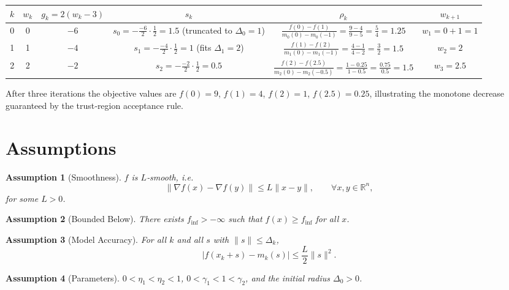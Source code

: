 \documentclass[11pt]{article}
\newtheorem{assumption}{Assumption}
\newcommand{\R}{\mathbb{R}}
\begin{document}
\begin{center}
\begin{tabular}{c|c|c|c|c|c}
$k$ & $w_{k}$ & $g_{k}=2(w_{k}-3)$ & $s_{k}$ & $\rho_{k}$ & $w_{k+1}$\\ \hline
0 & 0 & $-6$ & $s_{0}= -\frac{-6}{2}\cdot\frac12 =1.5$ (truncated to $\Delta_{0}=1$) & 
$\displaystyle\frac{f(0)-f(1)}{m_{0}(0)-m_{0}(-1)}=\frac{9-4}{9-5}= \frac{5}{4}=1.25$ & $w_{1}=0+1=1$\\ \hline
1 & 1 & $-4$ & $s_{1}= -\frac{-4}{2}\cdot\frac12 =1$ (fits $\Delta_{1}=2$) &
$\displaystyle\frac{f(1)-f(2)}{m_{1}(0)-m_{1}(-1)}=\frac{4-1}{4-2}= \frac{3}{2}=1.5$ & $w_{2}=2$\\ \hline
2 & 2 & $-2$ & $s_{2}= -\frac{-2}{2}\cdot\frac12 =0.5$ &
$\displaystyle\frac{f(2)-f(2.5)}{m_{2}(0)-m_{2}(-0.5)}=\frac{1-0.25}{1-0.5}= \frac{0.75}{0.5}=1.5$ & $w_{3}=2.5$
\end{tabular}
\end{center}
After three iterations the objective values are $f(0)=9$, $f(1)=4$, $f(2)=1$, $f(2.5)=0.25$, illustrating the monotone decrease guaranteed by the trust‑region acceptance rule.

\section*{Assumptions}
\begin{assumption}[Smoothness]\label{ass:smooth}
$f$ is $L$‑smooth, i.e.
\[
\|\nabla f(x)-\nabla f(y)\|\le L\|x-y\|,\qquad\forall x,y\in\R^{n},
\]
for some $L>0$.
\end{assumption}
\begin{assumption}[Bounded Below]\label{ass:bounded}
There exists $f_{\inf}>-\infty$ such that $f(x)\ge f_{\inf}$ for all $x$.
\end{assumption}
\begin{assumption}[Model Accuracy]\label{ass:model}
For all $k$ and all $s$ with $\|s\|\le\Delta_{k}$,
\[
|f(x_{k}+s)-m_{k}(s)|\le\frac{L}{2}\|s\|^{2}.
\]
\end{assumption}
\begin{assumption}[Parameters]\label{ass:params}
$0<\eta_{1}<\eta_{2}<1$, $0<\gamma_{1}<1<\gamma_{2}$, and the initial radius $\Delta_{0}>0$.
\end{assumption}
\end{document}
